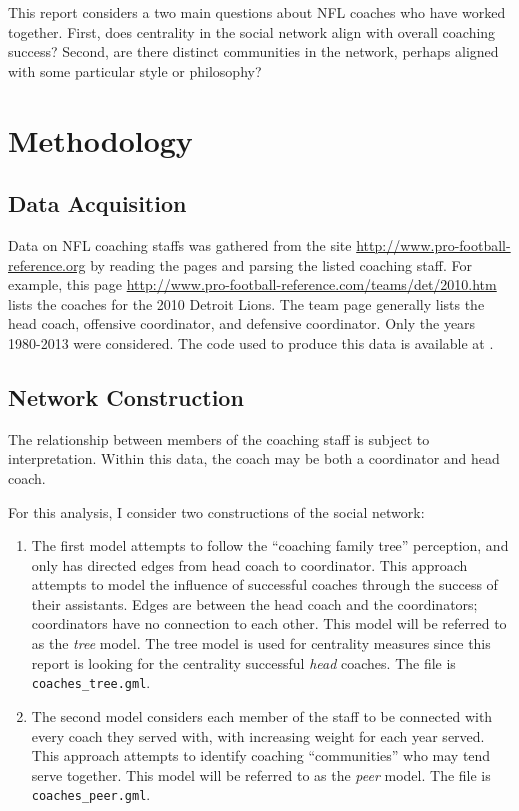 \documentclass[11pt]{article}\usepackage[]{graphicx}\usepackage[]{color}
\begin{document}
This report considers a two main questions about NFL coaches who have worked
together.  First, does centrality in the social network align with overall
coaching success?  Second, are there distinct communities in the network,
perhaps aligned with some particular style or philosophy?

\section{Methodology}

\subsection{Data Acquisition}

Data on NFL coaching staffs was gathered from the site
\url{http://www.pro-football-reference.org} by reading the pages and parsing
the listed coaching staff.  For example, this page
\url{http://www.pro-football-reference.com/teams/det/2010.htm} lists the
coaches for the 2010 Detroit Lions.  The team page generally lists the head
coach, offensive coordinator, and defensive coordinator.  Only the years
1980-2013 were considered.  The code used to produce this data is available at \cite{scraper}.

\subsection{Network Construction}

The relationship between members of the coaching staff is subject to
interpretation.  Within this data, the coach may be both a coordinator and head
coach.  

For this analysis, I consider two constructions of the social network:
\begin{enumerate}

\item The first model attempts to follow the ``coaching family tree''
perception, and only has directed edges from head coach to coordinator.  This
approach attempts to model the influence of successful coaches through the
success of their assistants.  Edges are between the head coach and the
coordinators; coordinators have no connection to each other.  This model will
be referred to as the \emph{tree} model.  The tree model is used for centrality
measures since this report is looking for the centrality successful
\emph{head} coaches.  The file is {\tt coaches\_tree.gml}.

\item The second model considers each member of the staff to be connected with
every coach they served with, with increasing weight for each year served.
This approach attempts to identify coaching ``communities'' who may tend serve
together.  This model will be referred to as the \emph{peer} model.  The file
is {\tt coaches\_peer.gml}.

\end{enumerate}
\end{document}
